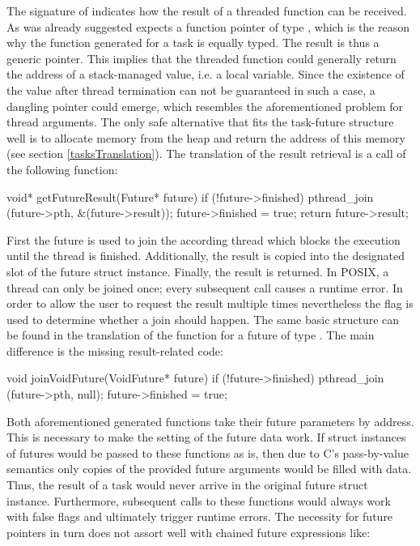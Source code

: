 The signature of  indicates how the result of a threaded function can be received. As was already suggested  expects a function pointer of type , which is the reason why the function generated for a task is equally typed. The result is thus a generic  pointer. This implies that the threaded function could generally return the address of a stack-managed value, i.e. a local variable. Since the existence of the value after thread termination can not be guaranteed in such a case, a dangling pointer \cite{UnderstandingAndUsingCPointers} could emerge, which resembles the aforementioned problem for thread arguments. The only safe alternative that fits the task-future structure well is to allocate memory from the heap and return the address of this memory (see section \ref{tasksTranslation}). The translation of the result retrieval is a call of the following function:

\begin{ccode}
void* getFutureResult(Future* future) { 
  if (!future->finished) { 
    pthread_join (future->pth, &(future->result)); 
    future->finished = true; 
  } 
  return future->result; 
} 
\end{ccode}
First the future is used to join the according thread which blocks the execution until the thread is finished. Additionally, the result is copied into the designated slot of the future struct instance. Finally, the result is returned. In POSIX, a thread can only be joined once; every subsequent call causes a runtime error. In order to allow the user to request the result multiple times nevertheless the  flag is used to determine whether a join should happen. The same basic structure can be found in the translation of the  function for a future of type . The main difference is the missing result-related code:
\begin{ccode}
void joinVoidFuture(VoidFuture* future) { 
  if (!future->finished) { 
    pthread_join (future->pth, null); 
    future->finished = true; 
  }
}
\end{ccode}
Both aforementioned generated functions take their future parameters by address. This is necessary to make the setting of the future data work. If struct instances of futures would be passed to these functions as is, then due to C's pass-by-value semantics only copies of the provided future arguments would be filled with data. Thus, the result of a task would never arrive in the original future struct instance. Furthermore, subsequent calls to these functions would always work with false  flags and ultimately trigger runtime errors. The necessity for future pointers in turn does not assort well with chained future expressions like:

